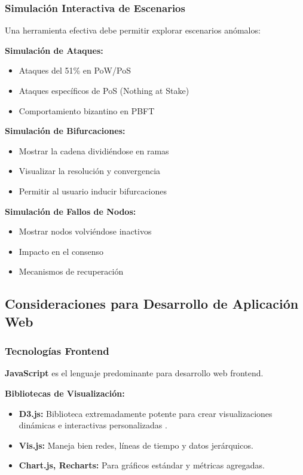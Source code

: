 \documentclass[spanish,12pt,letterpaper]{report}
\begin{document}
\subsubsection{Simulación Interactiva de Escenarios}

Una herramienta efectiva debe permitir explorar escenarios anómalos:

\textbf{Simulación de Ataques:}
\begin{itemize}
    \item Ataques del 51\% en PoW/PoS
    \item Ataques específicos de PoS (Nothing at Stake)
    \item Comportamiento bizantino en PBFT
\end{itemize}

\textbf{Simulación de Bifurcaciones:}
\begin{itemize}
    \item Mostrar la cadena dividiéndose en ramas
    \item Visualizar la resolución y convergencia
    \item Permitir al usuario inducir bifurcaciones
\end{itemize}

\textbf{Simulación de Fallos de Nodos:}
\begin{itemize}
    \item Mostrar nodos volviéndose inactivos
    \item Impacto en el consenso
    \item Mecanismos de recuperación
\end{itemize}

\subsection{Consideraciones para Desarrollo de Aplicación Web}

\subsubsection{Tecnologías Frontend}

\textbf{JavaScript} es el lenguaje predominante para desarrollo web frontend.

\textbf{Bibliotecas de Visualización:}
\begin{itemize}
    \item \textbf{D3.js:} Biblioteca extremadamente potente para crear visualizaciones dinámicas e interactivas personalizadas \parencite{d3js2025}.
    \item \textbf{Vis.js:} Maneja bien redes, líneas de tiempo y datos jerárquicos.
    \item \textbf{Chart.js, Recharts:} Para gráficos estándar y métricas agregadas.
\end{itemize}
\end{document}

